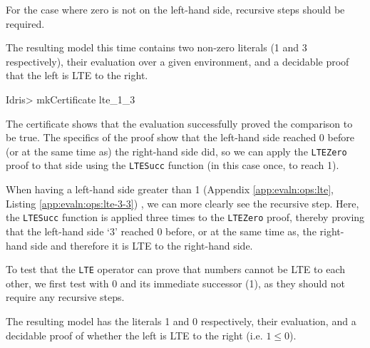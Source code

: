         \newpage
        
        
        
        For the case where zero is not on the left-hand side, recursive steps should be required.
        
        
        The resulting model this time contains two non-zero literals (1 and 3 respectively), their evaluation over a given environment, and a decidable proof that the left is LTE to the right.
        
        \begin{code}
            Idris> mkCertificate lte_1_3
        \end{code}
        
        The certificate shows that the evaluation successfully proved the comparison to be true. The specifics of the proof show that the left-hand side reached 0 before (or at the same time as) the right-hand side did, so we can apply the \texttt{LTEZero} proof to that side using the \texttt{LTESucc} function (in this case once, to reach 1).
        
        
        When having a left-hand side greater than 1 (Appendix \ref{app:evaln:ops:lte}, Listing \ref{app:evaln:ops:lte-3-3}) , we can more clearly see the recursive step. Here, the \texttt{LTESucc} function is applied three times to the \texttt{LTEZero} proof, thereby proving that the left-hand side `3' reached 0 before, or at the same time as, the right-hand side and therefore it is LTE to the right-hand side.
        
        
        
        To test that the \texttt{LTE} operator can prove that numbers cannot be LTE to each other, we first test with 0 and its immediate successor (1), as they should not require any recursive steps.
        
        \newpage
        
        
        The resulting \Idris model has the literals 1 and 0 respectively, their evaluation, and a decidable proof of whether the left is LTE to the right (i.e. $1 \leq 0$).
        
